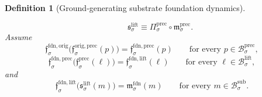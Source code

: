 \documentclass[11pt]{article}
\newcommand{\SubBody}[1]{\mathcal B_{#1}^{\mathrm{sub}}}
\newcommand{\LiftBody}[1]{\mathcal B_{#1}^{\mathrm{lift}}}
\newcommand{\LiftSelect}[1]{\mathfrak s_{#1}^{\mathrm{lift}}}
\newcommand{\PrecBody}[1]{\mathcal B_{#1}^{\mathrm{prec}}}
\newcommand{\PrecProj}[1]{\Pi_{#1}^{\mathrm{prec}}}
\newcommand{\PrecLiftMin}[1]{\mathfrak f_{#1}^{\mathrm{prec}}}
\newcommand{\PrecSubMin}[1]{\mathfrak m_{#1}^{\mathrm{prec}}}
\newcommand{\OrigPrecMin}[1]{\mathfrak f_{#1}^{\mathrm{orig,prec}}}
\newcommand{\FoundOrigMin}[1]{\mathfrak f_{#1}^{\mathrm{fdn,orig}}}
\newcommand{\FoundPrecMin}[1]{\mathfrak f_{#1}^{\mathrm{fdn,prec}}}
\newcommand{\FoundLiftMin}[1]{\mathfrak f_{#1}^{\mathrm{fdn,lift}}}
\newcommand{\FoundSubMin}[1]{\mathfrak m_{#1}^{\mathrm{fdn}}}
\newtheorem{definition}{Definition}
\begin{document}
\begin{definition}[Ground-generating substrate foundation dynamics]
\begin{enumerate}
\begin{equation}
    \qquad
    \LiftSelect{\sigma}
    \equiv
    \PrecProj{\sigma}\circ\PrecSubMin{\sigma}.
    \label{eq:foundinducedlowermin}
    \end{equation}
    Assume
    \begin{equation}
    \FoundOrigMin{\sigma}\bigl(\OrigPrecMin{\sigma}(p)\bigr)
    =
    \FoundPrecMin{\sigma}(p)
    \qquad
    \text{for every }p\in\PrecBody{\sigma},
    \label{eq:foundcompatorigprec}
    \end{equation}
    \begin{equation}
    \FoundPrecMin{\sigma}\bigl(\PrecLiftMin{\sigma}(\ell)\bigr)
    =
    \FoundLiftMin{\sigma}(\ell)
    \qquad
    \text{for every }\ell\in\LiftBody{\sigma},
    \label{eq:foundcompatpreclift}
    \end{equation}
    and
    \begin{equation}
    \FoundLiftMin{\sigma}\bigl(\LiftSelect{\sigma}(m)\bigr)
    =
    \FoundSubMin{\sigma}(m)
    \qquad
    \text{for every }m\in\SubBody{\sigma}.
    \label{eq:foundcompatliftsub}
    \end{equation}


\end{enumerate}
\end{definition}
\end{document}
